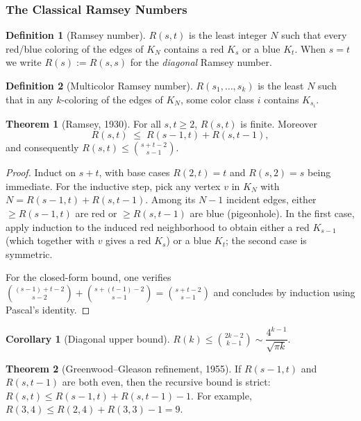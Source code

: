 \documentclass{article}
\theoremstyle{definition}
\newtheorem{theorem}{Theorem}
\newtheorem{corollary}{Corollary}
\newtheorem{definition}{Definition}
\begin{document}
\subsubsection{The Classical Ramsey Numbers}

\begin{definition}[Ramsey number]\label{def:ramsey}
$R(s, t)$ is the least integer $N$ such that every red/blue coloring
of the edges of $K_N$ contains a red $K_s$ or a blue $K_t$. When
$s = t$ we write $R(s) := R(s, s)$ for the \emph{diagonal} Ramsey
number.
\end{definition}

\begin{definition}[Multicolor Ramsey number]
$R(s_1, \dots, s_k)$ is the least $N$ such that in any $k$-coloring of
the edges of $K_N$, some color class $i$ contains $K_{s_i}$.
\end{definition}

\begin{theorem}[Ramsey, 1930]\label{thm:ramsey}
For all $s, t \ge 2$, $R(s, t)$ is finite. Moreover
\[
  R(s, t) \;\le\; R(s - 1, t) + R(s, t - 1),
\]
and consequently $R(s, t) \le \binom{s + t - 2}{s - 1}$.
\end{theorem}

\begin{proof}
Induct on $s + t$, with base cases $R(2, t) = t$ and $R(s, 2) = s$
being immediate. For the inductive step, pick any vertex $v$ in
$K_N$ with $N = R(s - 1, t) + R(s, t - 1)$. Among its $N - 1$ incident
edges, either $\ge R(s - 1, t)$ are red or $\ge R(s, t - 1)$ are blue
(pigeonhole). In the first case, apply induction to the induced red
neighborhood to obtain either a red $K_{s - 1}$ (which together with
$v$ gives a red $K_s$) or a blue $K_t$; the second case is symmetric.

For the closed-form bound, one verifies
$\binom{(s-1) + t - 2}{s - 2} + \binom{s + (t-1) - 2}{s - 1} = \binom{s + t - 2}{s - 1}$
and concludes by induction using Pascal's identity.
\end{proof}

\begin{corollary}[Diagonal upper bound]
$R(k) \le \binom{2k - 2}{k - 1} \sim \dfrac{4^{k - 1}}{\sqrt{\pi k}}$.
\end{corollary}

\begin{theorem}[Greenwood--Gleason refinement, 1955]
If $R(s - 1, t)$ and $R(s, t - 1)$ are both even, then the recursive bound
is strict: $R(s, t) \le R(s - 1, t) + R(s, t - 1) - 1$. For example,
$R(3, 4) \le R(2, 4) + R(3, 3) - 1 = 9$.
\end{theorem}
\end{document}
